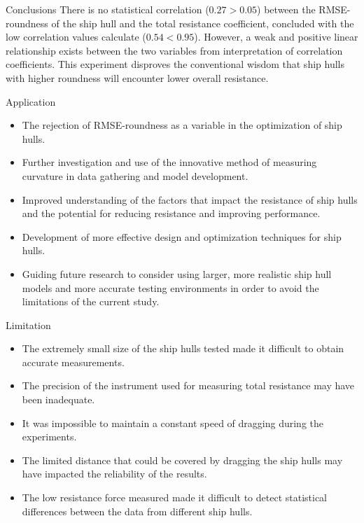 \documentclass[final, 20pt]{beamer}
\newlength{\colwidth}
\begin{document}
\begin{frame}[t]
\begin{columns}[t]
    \separatorcolumn

    \begin{column}{\colwidth}
      \begin{block}{Conclusions}
        There is no statistical correlation ($0.27 > 0.05$) between the RMSE-roundness of the ship hull and the total resistance coefficient, concluded with the low correlation values calculate ($0.54 < 0.95$). However, a weak and positive linear relationship exists between the two variables from interpretation of correlation coefficients. This experiment disproves the conventional wisdom that ship hulls with higher roundness will encounter lower overall resistance.
      \end{block}

      \vfill

      \begin{block}{Application}
        \begin{itemize}
          \item The rejection of RMSE-roundness as a variable in the optimization of ship hulls.
          \item Further investigation and use of the innovative method of measuring curvature in data gathering and model development.
          \item Improved understanding of the factors that impact the resistance of ship hulls and the potential for reducing resistance and improving performance.
          \item Development of more effective design and optimization techniques for ship hulls.
          \item Guiding future research to consider using larger, more realistic ship hull models and more accurate testing environments in order to avoid the limitations of the current study.
        \end{itemize}
      \end{block}

      \vfill

      \begin{block}{Limitation}
        \begin{itemize}
          \item The extremely small size of the ship hulls tested made it difficult to obtain accurate measurements.
          \item The precision of the instrument used for measuring total resistance may have been inadequate.
          \item It was impossible to maintain a constant speed of dragging during the experiments.
          \item The limited distance that could be covered by dragging the ship hulls may have impacted the reliability of the results.
          \item The low resistance force measured made it difficult to detect statistical differences between the data from different ship hulls.
        \end{itemize}


\end{block}
\end{column}
\end{columns}
\end{frame}
\end{document}
